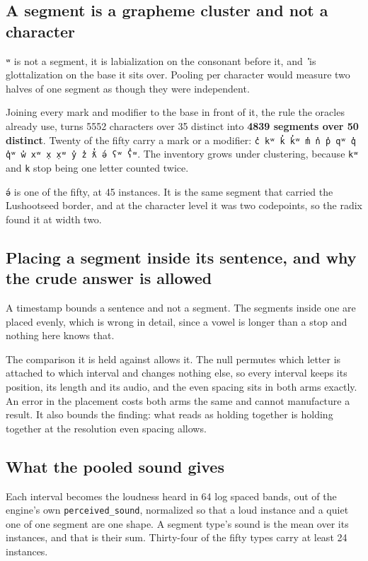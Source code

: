 \subsection{A segment is a grapheme cluster and not a character}

\texttt{ʷ} is not a segment, it is labialization on the consonant before it, and \texttt{̓} is
glottalization on the base it sits over. Pooling per character would measure two halves of one
segment as though they were independent.

Joining every mark and modifier to the base in front of it, the rule the oracles already
use, turns 5552 characters over 35 distinct into \textbf{4839 segments over 50 distinct}. Twenty of
the fifty carry a mark or a modifier: \texttt{c̓ kʷ k̓ k̓ʷ m̓ n̓ p̓ qʷ q̓ q̓ʷ w̓ xʷ x̣ x̣ʷ y̓ z̓ ƛ̓ ə́ ʕʷ ʕ̓ʷ}.
The inventory grows under clustering, because \texttt{kʷ} and \texttt{k} stop
being one letter counted twice.

\texttt{ə́} is one of the fifty, at 45 instances. It is the same segment that carried the Lushootseed
border, and at the character level it was two codepoints, so the radix found it at width
two.

\subsection{Placing a segment inside its sentence, and why the crude answer is allowed}

A timestamp bounds a sentence and not a segment. The segments inside one are placed evenly, which is
wrong in detail, since a vowel is longer than a stop and nothing here knows that.

The comparison it is held against allows it. The null permutes which letter is attached to
which interval and changes nothing else, so every interval keeps its position, its length and its
audio, and the even spacing sits in both arms exactly. An error in the placement costs both arms the
same and cannot manufacture a result. It also bounds the finding: what reads as holding together is
holding together at the resolution even spacing allows.

\subsection{What the pooled sound gives}

Each interval becomes the loudness heard in 64 log spaced bands, out of the engine's own
\texttt{perceived\_\allowbreak{}sound}, normalized so that a loud instance and a quiet one of one segment
are one shape. A segment type's sound is the mean over its instances, and that is their sum. Thirty-four
of the fifty types carry at least 24 instances.

